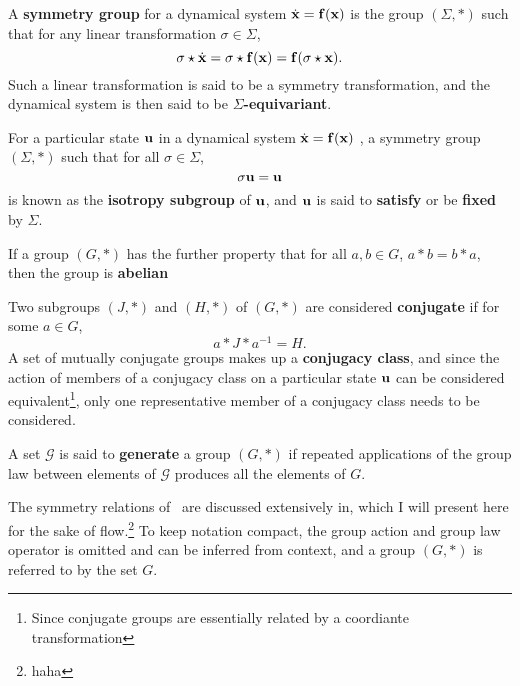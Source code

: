 \begin{define}\label{def:equivariance}
A {\bf symmetry group} for a dynamical system $\dot{\mathbf{x}} = \mathbf{f}(\mathbf{x})$  is the group $(\Sigma,\ast)$ such that for any linear transformation $\sigma \in \Sigma$, 
\begin{equation}
\sigma\star \dot{\mathbf{x}} = \sigma\star \mathbf{f}(\mathbf{x}) = \mathbf{f}(\sigma \star \mathbf{x}).
\end{equation}
Such a linear transformation is said to be a symmetry transformation, and the dynamical system is then said to be {\bf $\Sigma$-equivariant}.
\end{define}
\begin{define}
For a particular state $\mathbf{u}$ in a dynamical system $\dot{\mathbf{x}} = \mathbf{f}(\mathbf{x})$ , a symmetry group $(\Sigma,\ast)$ such that for all $\sigma \in \Sigma$,
\begin{equation}
\sigma \mathbf{u}  = \mathbf{u}
\end{equation}
is known as the {\bf isotropy subgroup} of $\mathbf{u}$, and $\mathbf{u}$ is said to {\bf satisfy} or be {\bf fixed} by $\Sigma$. 
\end{define}
\begin{define}
If a group $(G,\ast)$ has the further property that for all $a,b \in G$, $a \ast b = b \ast a$, then the group is {\bf abelian}
\end{define}
\begin{define}\label{def:conjugacy}
Two subgroups $(J,\ast)$ and $(H,\ast)$ of $(G,\ast)$ are considered {\bf conjugate} if for some $a \in G$,
\begin{equation}
a\ast J \ast a^{-1} = H.
\end{equation} 
A set of mutually conjugate groups makes up a {\bf conjugacy class}, and since the action of members of a conjugacy class on a particular state $\mathbf{u}$ can be considered equivalent\footnote{Since conjugate groups are essentially related by a coordiante transformation}, only one representative member of a conjugacy class needs to be considered. 
\end{define}
\begin{define}
A set $\mathcal{G}$ is said to {\bf generate} a group $(G,\ast)$ if repeated applications of the group law between elements of $\mathcal{G}$ produces all the elements of $G$.
\end{define}
The symmetry relations of \pCf\ are discussed extensively in, which I will present here for the sake of flow.\footnote{haha} To keep notation compact, the group action and group law operator is omitted and can be inferred from context, and a group $(G,\ast)$ is referred to by the set $G$. 

